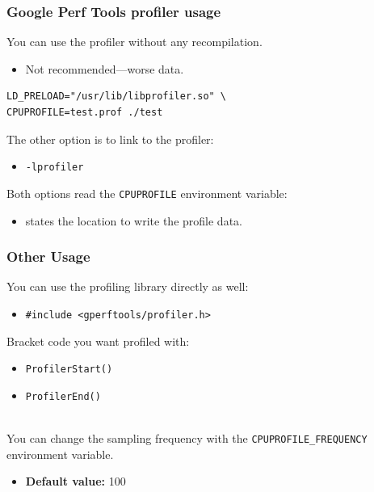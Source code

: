 \begin{frame}[fragile]
  \frametitle{Google Perf Tools profiler usage}

  
    You can use the profiler without any recompilation.
      \begin{itemize}
        \item Not recommended---worse data.
      \end{itemize}

  \begin{lstlisting}
LD_PRELOAD="/usr/lib/libprofiler.so" \
CPUPROFILE=test.prof ./test
  \end{lstlisting}

     The other option is to link to the profiler:
      \begin{itemize}
        \item {\tt -lprofiler}
      \end{itemize}
    Both options read the {\tt CPUPROFILE} environment variable:
      \begin{itemize}
        \item states the location to write the profile data.
      \end{itemize}
  
\end{frame}

\begin{frame}[fragile]
  \frametitle{Other Usage}

  
     You can use the profiling library directly as well:
      \begin{itemize}
        \item {\tt \#include <gperftools/profiler.h>}
      \end{itemize}
     Bracket code you want profiled with:
      \begin{itemize}
        \item {\tt ProfilerStart()}
        \item {\tt ProfilerEnd()}
      \end{itemize}~\\
    
    You can change the sampling frequency with the
      {\tt CPUPROFILE\_FREQUENCY} environment variable.
      \begin{itemize}
        \item {\bf Default value:} 100
      \end{itemize}
  
\end{frame}

